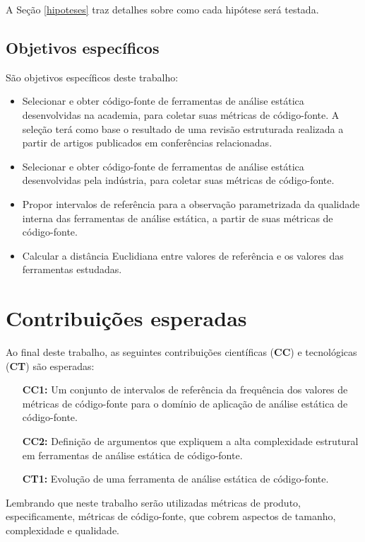 A Seção \ref{hipoteses} traz detalhes sobre como cada hipótese será testada.

\subsection{Objetivos específicos}

São objetivos específicos deste trabalho:

\begin{itemize}
  \item Selecionar e obter código-fonte de ferramentas de análise estática
    desenvolvidas na academia, para coletar suas métricas de código-fonte.  A
    seleção terá como base o resultado de uma revisão estruturada realizada a
    partir de artigos publicados em conferências relacionadas. 
  \item Selecionar e obter código-fonte de ferramentas de análise estática
    desenvolvidas pela indústria, para coletar suas métricas de código-fonte.
  \item Propor intervalos de referência para a observação parametrizada da
    qualidade interna das ferramentas de análise estática, a partir de suas
    métricas de código-fonte.
  \item Calcular a distância Euclidiana entre valores de referência e os
    valores das ferramentas estudadas.
\end{itemize}

\section{Contribuições esperadas}

Ao final deste trabalho, as seguintes contribuições científicas ({\bf CC}) e
tecnológicas ({\bf CT}) são esperadas:

\begin{enumerate}
  \item [{\bf CC1:}] Um conjunto de intervalos de referência da frequência dos
    valores de métricas de código-fonte para o domínio de aplicação de
    análise estática de código-fonte.
  \item [{\bf CC2:}] Definição de argumentos que expliquem a alta complexidade
    estrutural em ferramentas de análise estática de código-fonte.
  \item [{\bf CT1:}] Evolução de uma ferramenta de análise estática de
    código-fonte.
\end{enumerate}

Lembrando que neste trabalho serão utilizadas métricas de produto,
especificamente, métricas de código-fonte, que cobrem aspectos de tamanho,
complexidade e qualidade.

